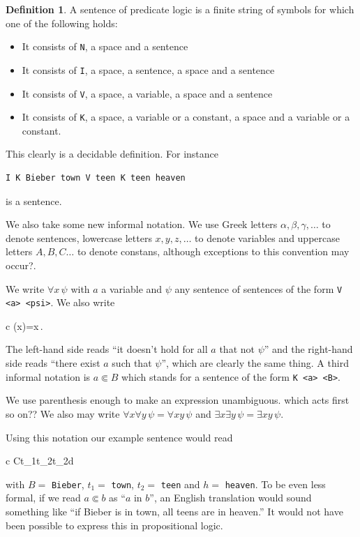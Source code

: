 \documentclass[11pt,oneside,%
]{memoir}
\newenvironment{eqna}{\begin{IEEEeqnarray}{c}}{\end{IEEEeqnarray}\ignorespacesafterend}
\theoremstyle{definition}
\newtheorem{maaritelma}{Definition}
\newcommand{\joukk}{\lstinline[language=joukko]}
\begin{document}
\begin{maaritelma}
A sentence of predicate logic is a finite string of symbols for which one of the following holds:
\begin{itemize}
    \item It consists of \joukk!N!, a space and a sentence
    \item It consists of \joukk!I!, a space, a sentence, a space and a sentence
    \item It consists of \joukk!V!, a space, a variable, a space and a sentence
    \item It consists of \joukk!K!, a space, a variable or a constant, a space and a variable or a constant.
\end{itemize}
\end{maaritelma}
This clearly is a decidable definition. For instance
\begin{lstlisting}[language=joukko]
I K Bieber town V teen K teen heaven
\end{lstlisting}
is a sentence.

We also take some new informal notation. We use Greek letters \(\alpha,\beta,\gamma,\dotsc\) to denote sentences, lowercase letters \(x,y,z,\dotsc\) to denote variables and uppercase letters \(A,B,C\dotsc\) to denote constans, although exceptions to this convention may occur?.

 We write \(\forall x\,\psi\) with \(a\) a variable and \(\psi\) any sentence of sentences of the form \joukk!V <a> <psi>!. We also write
\begin{eqna}
    \neg(\forall x\neg \psi)=\exists x\,\psi.
\end{eqna}
The left-hand side reads ``it doesn't hold for all \(a\) that not \(\psi\)'' and the right-hand side reads ``there exist \(a\) such that \(\psi\)'', which are clearly the same thing. A third informal notation is \(a\Subset B\) which stands for a sentence of the form \joukk!K <a> <B>!.

We use parenthesis enough to make an expression unambiguous. which acts first so on?? We also may write \(\forall x\forall y\,\psi=\forall xy\,\psi\) and \(\exists x\exists y\,\psi=\exists xy\,\psi\).

Using this notation our example sentence would read
\begin{eqna}
    C\Subset t_1\rightarrow\forall t_2\:t_2\Subset d
\end{eqna}
with \(B=\) \joukk!Bieber!, \(t_1=\) \joukk!town!, \(t_2=\) \joukk!teen! and \(h=\) \joukk!heaven!. To be even less formal, if we read \(a\Subset b\) as ``\(a\) in \(b\)'', an English translation would sound something like ``if Bieber is in town, all teens are in heaven.'' It would not have been possible to express this in propositional logic.
\end{document}
